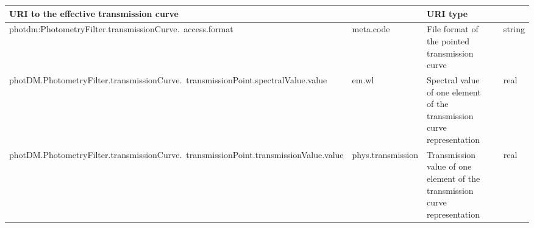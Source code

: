 \documentclass[11pt,a4paper]{ivoa}
\begin{document}
\begin{appendices}
\begin{table}[H]
\begin{adjustbox}{angle=90}
\begin{tabular}{p{2.5in}|p{1.5in}|p{2in}|p{0.74in}|p{0.35in}}
\multicolumn{1}{p{2in}}{{\fontsize{8pt}{8pt}\selectfont URI to the
effective transmission curve}} &
\multicolumn{1}{p{0.74in}}{} &
\multicolumn{1}{p{0.35in}}{{\fontsize{8pt}{8pt}\selectfont URI type}} \\
\hline
\multicolumn{1}{p{2.5in}}{{\fontsize{8pt}{8pt}
\selectfont photdm:PhotometryFilter.transmissionCurve.\ access.format}} &
\multicolumn{1}{p{1.5in}}{{\fontsize{8pt}{8pt}\selectfont meta.code}} &
\multicolumn{1}{p{2in}}{{\fontsize{8pt}{8pt}\selectfont File format of the pointed transmission curve}} &
\multicolumn{1}{p{0.74in}}{} &
\multicolumn{1}{p{0.35in}}{{\fontsize{8pt}{8pt}\selectfont string}} \\
\hline
\multicolumn{1}{p{2.5in}}{{\fontsize{8pt}{8pt}
\selectfont photDM.PhotometryFilter.transmissionCurve.\ transmissionPoint.spectralValue.value}} &
\multicolumn{1}{p{1.5in}}{{\fontsize{8pt}{8pt}\selectfont em.wl}} &
\multicolumn{1}{p{2in}}{{\fontsize{8pt}{8pt}\selectfont Spectral value
of one element of the transmission curve representation}} &
\multicolumn{1}{p{0.74in}}{} &
\multicolumn{1}{p{0.35in}}{{\fontsize{8pt}{8pt}\selectfont real}} \\
\hline
\multicolumn{1}{p{2.5in}}{{\fontsize{8pt}{8pt}
\selectfont photDM.PhotometryFilter.transmissionCurve.\ transmissionPoint.transmissionValue.value}} &
\multicolumn{1}{p{1.5in}}{{\fontsize{8pt}{8pt}
\selectfont phys.transmission}} &
\multicolumn{1}{p{2in}}{{\fontsize{8pt}{8pt}\selectfont Transmission value of
one element of the transmission curve representation}} &
\multicolumn{1}{p{0.74in}}{} &
\multicolumn{1}{p{0.35in}}{{\fontsize{8pt}{8pt}\selectfont real}} \\
\hline

\end{tabular}
\end{adjustbox}
 \end{table}





\newpage



\end{appendices}
\end{document}
